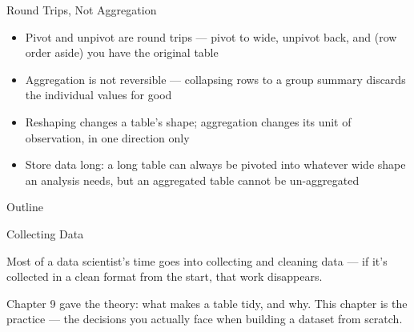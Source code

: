 \documentclass[8pt,aspectratio=169]{beamer}
\begin{document}
\begin{textframe}{Round Trips, Not Aggregation}

\begin{itemize}
\item Pivot and unpivot are round trips --- pivot to wide, unpivot back, and (row order aside) you have the original table
\item Aggregation is not reversible --- collapsing rows to a group summary discards the individual values for good
\item Reshaping changes a table's shape; aggregation changes its unit of observation, in one direction only
\item Store data long: a long table can always be pivoted into whatever wide shape an analysis needs, but an aggregated table cannot be un-aggregated
\end{itemize}

\end{textframe}

\begin{outlineframe}{Outline}
\end{outlineframe}


\begin{textframe}{Collecting Data}

Most of a data scientist's time goes into collecting and cleaning data --- if it's collected in a clean format from the start, that work disappears.

Chapter 9 gave the theory: what makes a table tidy, and why. This chapter is the practice --- the decisions you actually face when building a dataset from scratch.

\end{textframe}
\end{document}
